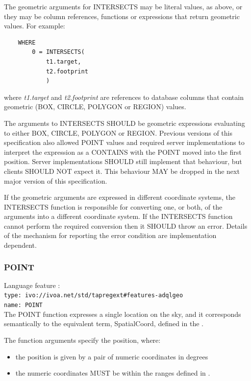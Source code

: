 \documentclass[11pt,a4paper]{ivoa}
\begin{document}
The geometric arguments for INTERSECTS may be literal values, as above,
or they may be column references, functions or expressions that return
geometric values.
For example:
\begin{verbatim}
    WHERE
        0 = INTERSECTS(
            t1.target,
            t2.footprint
            )
\end{verbatim}
where \textit{t1.target} and \textit{t2.footprint} are references to
database columns that contain geometric (BOX, CIRCLE, POLYGON or REGION) values.

The arguments to INTERSECTS SHOULD be geometric expressions evaluating to
either BOX, CIRCLE, POLYGON or REGION.
Previous versions of this
specification also allowed POINT values and required server implementations to
interpret the expression as a CONTAINS with the POINT moved into the first position.
Server implementations SHOULD still implement that behaviour, but clients
SHOULD NOT expect it.
This behaviour MAY be dropped in the next major version of this specification.

If the geometric arguments are expressed in different coordinate systems,
the INTERSECTS function is responsible for converting one, or both, of the
arguments into a different coordinate system.
If the INTERSECTS function cannot perform the required conversion then
it SHOULD throw an error.
Details of the mechanism for reporting the error condition are
implementation dependent.

\subsubsection{POINT}
\label{sec:functions.geom.point}
{\footnotesize Language feature :}\\
{\footnotesize \verb|type: ivo://ivoa.net/std/tapregext#features-adqlgeo|}\\
{\footnotesize \verb|name: POINT|}\\

The POINT function expresses a single location on the sky,
and it corresponds semantically to the equivalent term, SpatialCoord, defined in
the \STCSpec{}.

The function arguments specify the position, where:
\begin{itemize}
    \item the position is given by a pair of numeric coordinates in degrees
    \item the numeric coordinates MUST be within the ranges defined in
    .
\end{itemize}
\end{document}
